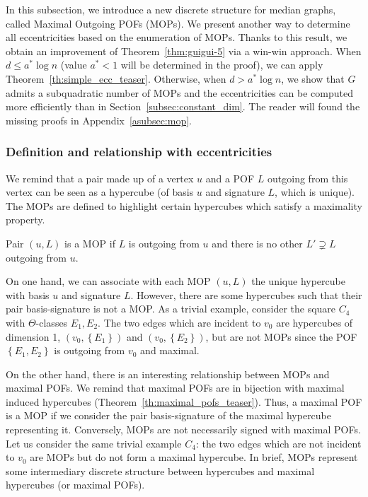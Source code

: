 \documentclass[a4paper,UKenglish,numberwithinsect,cleveref, autoref,anonymous]{lipics-v2021}
\newcommand{\set}[1]{\left\{ #1 \right\}}
\begin{document}
In this subsection, we introduce a new discrete structure for median graphs, called Maximal Outgoing POFs (MOPs). We present another way to determine all eccentricities based on the enumeration of MOPs. Thanks to this result, we obtain an improvement of Theorem~\ref{thm:guigui-5} via a win-win approach. When $d \le a^*\log n$ (value $a^*<1$ will be determined in the proof), we can apply Theorem~\ref{th:simple_ecc_teaser}. Otherwise, when $d > a^* \log n$, we show that $G$ admits a subquadratic number of MOPs and the eccentricities can be computed more efficiently than in Section~\ref{subsec:constant_dim}. The reader will found the missing proofs in Appendix~\ref{asubsec:mop}.

\subsubsection{Definition and relationship with eccentricities} \label{subsubsec:def_mop}

We remind that a pair made up of a vertex $u$ and a POF $L$ outgoing from this vertex can be seen as a hypercube (of basis $u$ and signature $L$, which is unique). The MOPs are defined to highlight certain hypercubes which satisfy a maximality property.

\begin{definition}
Pair $(u,L)$ is a MOP if $L$ is outgoing from $u$ and there is no other $L' \supsetneq L$ outgoing from $u$.
\label{def:mop}
\end{definition}

On one hand, we can associate with each MOP $(u,L)$ the unique hypercube with basis $u$ and signature $L$. However, there are some hypercubes such that their pair basis-signature is not a MOP. As a trivial example, consider the square $C_4$ with $\Theta$-classes $E_1,E_2$. The two edges which are incident to $v_0$ are hypercubes of dimension 1, $(v_0,\set{E_1})$ and $(v_0,\set{E_2})$, but are not MOPs since the POF $\set{E_1,E_2}$ is outgoing from $v_0$ and maximal.

On the other hand, there is an interesting relationship between MOPs and maximal POFs. We remind that maximal POFs are in bijection with maximal induced hypercubes (Theorem~\ref{th:maximal_pofs_teaser}). Thus, a maximal POF is a MOP if we consider the pair basis-signature of the maximal hypercube representing it. Conversely, MOPs are not necessarily signed with maximal POFs. Let us consider the same trivial example $C_4$: the two edges which are not incident to $v_0$ are MOPs but do not form a maximal hypercube. In brief, MOPs represent some intermediary discrete structure between hypercubes and maximal hypercubes (or maximal POFs).
\end{document}
